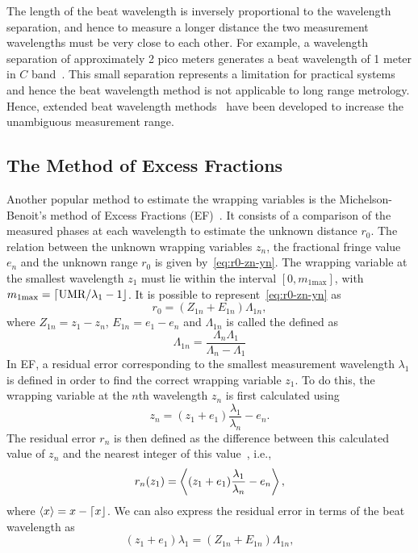 The length of the beat wavelength is inversely proportional to the wavelength separation, and hence to measure a longer distance the two measurement wavelengths must be very close to each other. For example, a wavelength separation of approximately 2 pico meters generates a beat wavelength of 1 meter in $C$ band~\cite{Falaggis:09}. This small separation represents a limitation for practical systems and hence the beat wavelength method is not applicable to long range metrology. Hence, extended beat wavelength methods~\cite{deGroot_94, Falaggis:09, Towers2011} have been developed to increase the unambiguous measurement range. 


\subsection{The Method of Excess Fractions}
Another popular method to estimate the wrapping variables is the Michelson-Benoit's method of Excess Fractions (EF)~\cite{Falaggis_excess_fractions_2011}. It consists of a comparison of the measured phases at each wavelength to estimate the unknown distance $r_0$. The relation between the unknown wrapping variables $z_n$, the fractional fringe value $e_n$ and the unknown range $r_0$ is given by~\ref{eq:r0-zn-yn}. The wrapping variable at the smallest wavelength $z_1$ must lie within the interval $[0, m_{1\text{max}}]$, with $m_{1\text{max}} = {\left\lceil \text{UMR}/\lambda_1 -1 \right\rfloor}$. It is possible to represent~\ref{eq:r0-zn-yn} as
\[
r_0 = (Z_{1n} + E_{1n})\Lambda_{1n},
\]
where $Z_{1n} = z_1 - z_n$, $E_{1n}=e_{1} -e_{n}$ and $\Lambda_{1n}$ is called the  defined as
\[
\Lambda_{1n} = \dfrac{\Lambda_n\Lambda_1}{\Lambda_n - \Lambda_1}
\]
In EF, a residual error corresponding to the smallest measurement wavelength $\lambda_1$ is defined in order to find the correct wrapping variable $z_1$. To do this, the wrapping variable at the $n$th wavelength $z_n$ is first calculated using~\cite{Falaggis_excess_fractions_2011}
\[
z_n = (z_1 + e_1)\dfrac{\lambda_1}{\lambda_n} - e_n.
\]
The residual error $r_n$ is then defined as the difference between this calculated value of $z_n$ and the nearest integer of this value~\cite{Falaggis_excess_fractions_2011}, i.e.,
\begin{equation}\label{eq:residual-error-1}
r_n(z_1) = \left\langle (z_1 + e_1)\dfrac{\lambda_1}{\lambda_n} - e_n \right\rangle,
\end{equation}
where $\left\langle x \right\rangle=x - {\left\lceil x \right\rfloor}$. We can also express the residual error in terms of the beat wavelength as 
\[
(z_1 + e_1)\lambda_1 = (Z_{1n} + E_{1n})\Lambda_{1n},
\]
